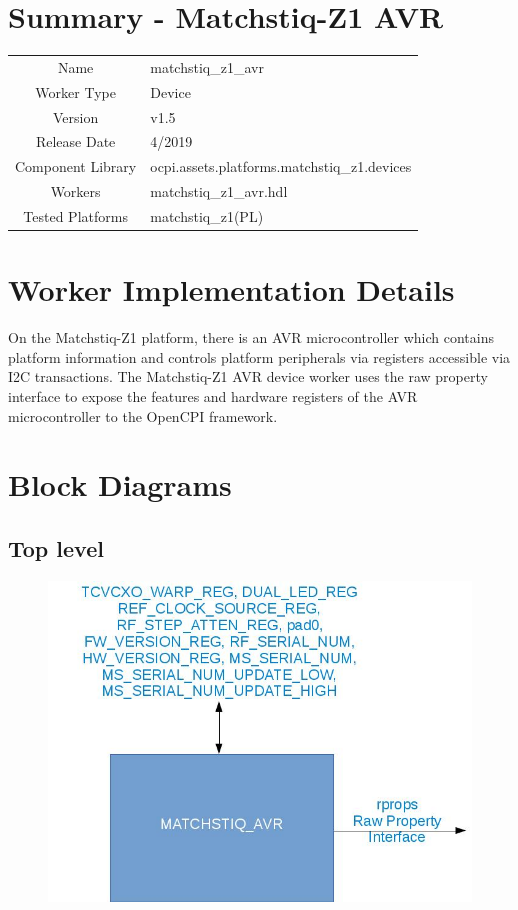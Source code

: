 \documentclass{article}
\author{} %
\date{Version \docVersion} %
\title{\docTitle}
\def\docVersion{1.5}
\def\comp{matchstiq\_z1\_avr}
\def\Comp{Matchstiq-Z1 AVR}
\begin{document}
\section*{Summary - \Comp}
\begin{tabular}{|c|M{13.5cm}|}
	\hline
	                  &                                        			\\
	\hline
	Name              & \comp                                  			\\
	\hline
	Worker Type       & Device                                 			\\
	\hline
	Version           & v\docVersion \\
	\hline
	Release Date      & 4/2019 \\
	\hline
	Component Library & ocpi.assets.platforms.matchstiq\_z1.devices		\\
	\hline
	Workers           & \comp.hdl                              			\\
	\hline
	Tested Platforms  & matchstiq\_z1(PL)                       			\\
	\hline
\end{tabular}

\section*{Worker Implementation Details}
On the Matchstiq-Z1 platform, there is an AVR microcontroller which contains platform information and controls platform peripherals via registers accessible via I2C transactions. The \Comp{} device worker uses the raw property interface to expose the features and hardware registers of the AVR microcontroller to the OpenCPI framework.

\section*{Block Diagrams}
\subsection*{Top level}
\begin{figure}[ht]
	\centerline{\includegraphics[scale=0.4]{matchstiq_z1_avr_top_level}}
	\label{fig:tb}
\end{figure}
\end{document}
